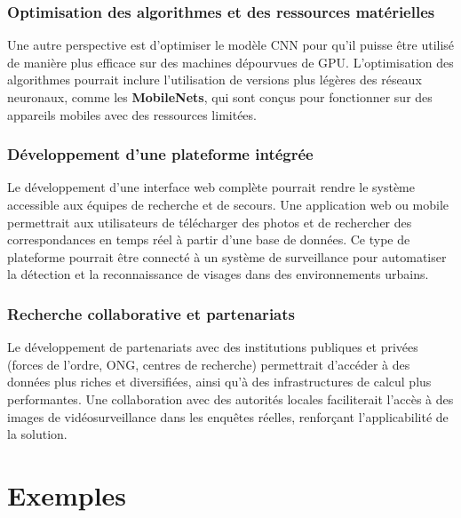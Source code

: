 \documentclass[a4paper,12pt]{report}
\begin{document}
\subsection{Optimisation des algorithmes et des ressources matérielles}
Une autre perspective est d’optimiser le modèle CNN pour qu'il puisse être utilisé de manière plus efficace sur des machines dépourvues de GPU. L’optimisation des algorithmes pourrait inclure l’utilisation de versions plus légères des réseaux neuronaux, comme les \textbf{MobileNets}, qui sont conçus pour fonctionner sur des appareils mobiles avec des ressources limitées.

\subsection{Développement d'une plateforme intégrée}
Le développement d'une interface web complète pourrait rendre le système accessible aux équipes de recherche et de secours. Une application web ou mobile permettrait aux utilisateurs de télécharger des photos et de rechercher des correspondances en temps réel à partir d'une base de données. Ce type de plateforme pourrait être connecté à un système de surveillance pour automatiser la détection et la reconnaissance de visages dans des environnements urbains.

\subsection{Recherche collaborative et partenariats}
Le développement de partenariats avec des institutions publiques et privées (forces de l’ordre, ONG, centres de recherche) permettrait d’accéder à des données plus riches et diversifiées, ainsi qu'à des infrastructures de calcul plus performantes. Une collaboration avec des autorités locales faciliterait l’accès à des images de vidéosurveillance dans les enquêtes réelles, renforçant l'applicabilité de la solution.

\appendix
\chapter{Exemples}
\end{document}
